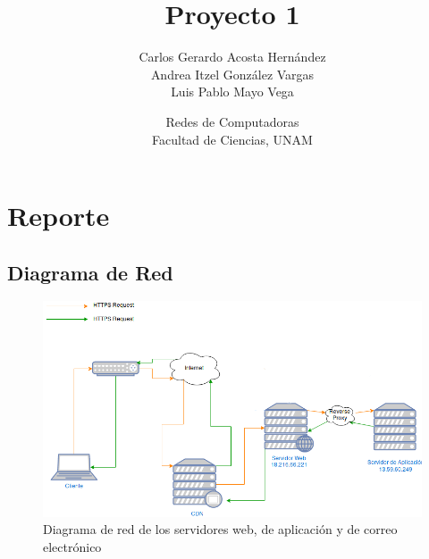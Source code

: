 \documentclass[9pt]{article}
\title{Proyecto 1}
\author{Carlos Gerardo Acosta Hernández \\ Andrea Itzel González Vargas \\ Luis Pablo Mayo Vega}
\date{Redes de Computadoras\\Facultad de Ciencias, UNAM}
\begin{document}
\maketitle

\section*{Reporte}

\subsection*{Diagrama de Red}
\begin{figure}[ht!]
  \centering
  \includegraphics[width=0.8\linewidth]{net_diagram}
  \caption{Diagrama de red de los servidores web, de aplicación y de correo electrónico}
\end{figure}
\end{document}
